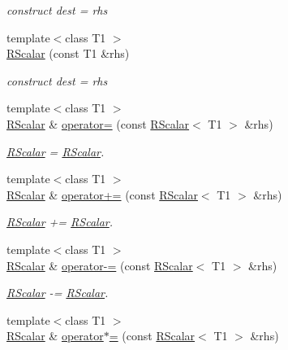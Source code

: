 \begin{DoxyCompactItemize}
\begin{DoxyCompactList}\small\item\em construct dest = rhs \end{DoxyCompactList}\item 
{\footnotesize template$<$class T1 $>$ }\\\mbox{\hyperlink{classENSEM_1_1RScalar_aef7513413ed5dbf6bb8bc37b73b88d00}{R\+Scalar}} (const T1 \&rhs)
\begin{DoxyCompactList}\small\item\em construct dest = rhs \end{DoxyCompactList}\item 
{\footnotesize template$<$class T1 $>$ }\\\mbox{\hyperlink{classENSEM_1_1RScalar}{R\+Scalar}} \& \mbox{\hyperlink{classENSEM_1_1RScalar_a81b105339878a490866e9467135ae4fa}{operator=}} (const \mbox{\hyperlink{classENSEM_1_1RScalar}{R\+Scalar}}$<$ T1 $>$ \&rhs)
\begin{DoxyCompactList}\small\item\em \mbox{\hyperlink{classENSEM_1_1RScalar}{R\+Scalar}} = \mbox{\hyperlink{classENSEM_1_1RScalar}{R\+Scalar}}. \end{DoxyCompactList}\item 
{\footnotesize template$<$class T1 $>$ }\\\mbox{\hyperlink{classENSEM_1_1RScalar}{R\+Scalar}} \& \mbox{\hyperlink{classENSEM_1_1RScalar_adc6bf2610b8af0ab175ef00d9194aa1d}{operator+=}} (const \mbox{\hyperlink{classENSEM_1_1RScalar}{R\+Scalar}}$<$ T1 $>$ \&rhs)
\begin{DoxyCompactList}\small\item\em \mbox{\hyperlink{classENSEM_1_1RScalar}{R\+Scalar}} += \mbox{\hyperlink{classENSEM_1_1RScalar}{R\+Scalar}}. \end{DoxyCompactList}\item 
{\footnotesize template$<$class T1 $>$ }\\\mbox{\hyperlink{classENSEM_1_1RScalar}{R\+Scalar}} \& \mbox{\hyperlink{classENSEM_1_1RScalar_a6d158db5ecf3dcc81fe905c6664cac58}{operator-\/=}} (const \mbox{\hyperlink{classENSEM_1_1RScalar}{R\+Scalar}}$<$ T1 $>$ \&rhs)
\begin{DoxyCompactList}\small\item\em \mbox{\hyperlink{classENSEM_1_1RScalar}{R\+Scalar}} -\/= \mbox{\hyperlink{classENSEM_1_1RScalar}{R\+Scalar}}. \end{DoxyCompactList}\item 
{\footnotesize template$<$class T1 $>$ }\\\mbox{\hyperlink{classENSEM_1_1RScalar}{R\+Scalar}} \& \mbox{\hyperlink{classENSEM_1_1RScalar_a4e8f4b8988a47a5e5eef56424d0e23d9}{operator$\ast$=}} (const \mbox{\hyperlink{classENSEM_1_1RScalar}{R\+Scalar}}$<$ T1 $>$ \&rhs)

\end{DoxyCompactItemize}
